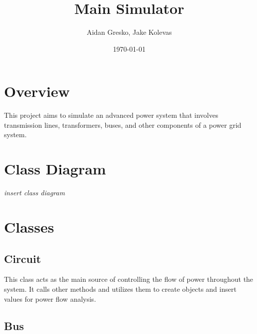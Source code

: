 \documentclass{article}
\author{Aidan Gresko, Jake Kolevas}
\title{Main Simulator}
\date{\today}
\begin{document}
	\maketitle
	
	\section{Overview}
	This project aims to simulate an advanced power system that involves transmission lines, transformers, buses, and other components of a power grid system.
	
	\section{Class Diagram}
	
	\textit{insert class diagram}
	
	\section{Classes}
	
	\subsection{Circuit}
	This class acts as the main source of controlling the flow of power throughout the system. It calls other methods and utilizes them to create objects and insert values for power flow analysis.
	
	\subsection{Bus}
	
	
	
	
\end{document}

